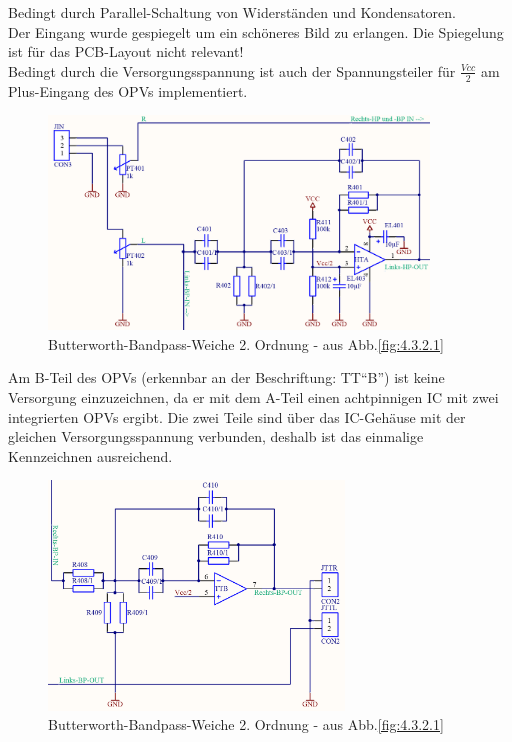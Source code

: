 Bedingt durch Parallel-Schaltung von Widerständen und Kondensatoren.\\ 
Der Eingang wurde gespiegelt um ein schöneres Bild zu erlangen.
Die Spiegelung ist für das PCB-Layout nicht relevant!\\
Bedingt durch die Versorgungsspannung ist auch der Spannungsteiler für $\frac{Vcc}{2}$ am Plus-Eingang des OPVs implementiert.
\begin{figure} [H]
	\centering	
	\includegraphics[width=0.9\textwidth]{img/Print4/4_TTuHTWeiche-LinksHP-Schematic.PNG}
	\caption{Butterworth-Bandpass-Weiche 2. Ordnung - aus Abb.\ref{fig:4.3.2.1}}
	\label {fig:4.3.2.2}
\end{figure}
Am B-Teil des OPVs (erkennbar an der Beschriftung: TT\enquote{B}) ist keine Versorgung einzuzeichnen, da er mit dem A-Teil einen achtpinnigen IC mit zwei integrierten OPVs ergibt.
Die zwei Teile sind über das IC-Gehäuse mit der gleichen Versorgungsspannung verbunden, deshalb ist das einmalige Kennzeichnen ausreichend.\\
\begin{figure} [H]
	\centering	
	\includegraphics[width=0.7\textwidth]{img/Print4/4_TTuHTWeiche-RechtsBP-Schematic.PNG}
	\caption{Butterworth-Bandpass-Weiche 2. Ordnung - aus Abb.\ref{fig:4.3.2.1}}
	\label {fig:4.3.2.3}
\end{figure}

